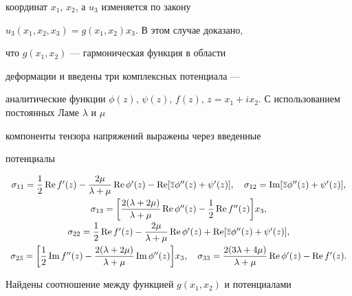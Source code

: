 координат $x_1$, $x_2$, а $u_3$ изменяется по закону


$u_3(x_1,x_2,x_3) = g(x_1,x_2) x_3$. В этом случае доказано,


что $g(x_1,x_2)$ --- гармоническая функция в области


деформации и введены три комплексных потенциала ---


аналитические функции $\phi(z)$, $ \psi(z)$, $f(z)$, $z = x_1 +


ix_2$. С использованием постоянных Ламе $\lambda$ и $\mu$


компоненты тензора напряжений выражены через введенные


потенциалы


\begin{equation}


\begin{array}{c}


\sigma_{11} = \dfrac{1}{2} \re f'(z) - \dfrac{2\mu}{\lambda + \mu} \re


\phi'(z) - \re [\overline{z} \phi''(z) + \psi'(z)], \quad


\sigma_{12} = \im [\overline{z} \phi''(z) + \psi'(z)], \\[3mm]


%


\sigma_{13} = \bigg[\dfrac{2(\lambda + 2\mu)}{\lambda + \mu}


\re \phi''(z) -\dfrac{1}{2} \re f''(z)\bigg] x_3, \\[3mm]


%


\sigma_{22} = \dfrac{1}{2} \re f'(z) -


\dfrac{2\mu}{\lambda + \mu} \re


\phi'(z) + \re [\overline{z} \phi''(z) + \psi'(z)],\\[3mm]


%


\sigma_{23} = \bigg[\dfrac{1}{2} \im f''(z) -


\dfrac{2(\lambda + 2\mu)}{\lambda + \mu} \im \phi''(z)\bigg] x_3,\quad


\sigma_{33} = \dfrac{2(3\lambda + 4 \mu)}{\lambda + \mu} \re \phi'(z) -


\re f'(z).


\end{array}


\end{equation}


Найдены соотношение между функцией $g(x_1,x_2)$ и потенциалами


